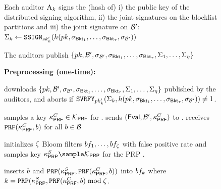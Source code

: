 \begin{figure}
{\begin{minipage}[t]{\textwidth}
\item 
Each auditor $\auditor[\auditorIdx]$ signs the (hash of) i) the public key of the distributed signing algorithm, ii) the joint signatures on the blocklist partitions and iii) the joint signature on $\blocklist'$:  $\auditorSig{\auditorIdx} \assign \signGenSig[\auditorPrivKeyGenericScheme[\auditorIdx]](\hashFn(\pubKey,  \genericSig[\bucket{1}], \dots, \genericSig[\bucket{\numBuckets}], \genericSig[\blocklist']))$

\item The auditors publish $\{\pubKey, \blocklist', \genericSig[\blocklist'], \genericSig[\bucket{1}], \dots, \genericSig[\bucket{\numBuckets}], \auditorSig{1}, \dots, \auditorSig{\numAuditors}  \}$ 


\protocolStepListEnd

\smallskip\noindent\textbf{Preprocessing (one-time):}



\item \label{pre:authOPRF} \client downloads $\{\pubKey, \blocklist', \genericSig[\blocklist'], \genericSig[\bucket{1}], \dots, \genericSig[\bucket{\numBuckets}], \auditorSig{1}, \dots, \auditorSig{\numAuditors} \}$ published by the auditors, and aborts if $\verifyGenSig[\auditorPubKeyGenericScheme[\auditorIdx]] (\auditorSig{\auditorIdx}, \hashFn(\pubKey,  \genericSig[\bucket{1}], \dots, \genericSig[\bucket{\numBuckets}], \genericSig[\blocklist'])) \neq 1$. 

\item \client samples a key $\kappa_{\mathsf{PRF}}^{C} \in \mathcal{K}_{\mathsf{PRF}}$ for \prf.  \client sends $(\evaluate, \blocklist', \prfKeyClient)$ to \authOPRFFunc. \server receives $\prf(\prfKeyClient, \genericBlocklistElmt)$ for all $\genericBlocklistElmt \in \blocklist$




\item \label{pre:bloom_filter_init} \server initializes $\zeta$ Bloom filters $\bloomFilter[1], \dots, \bloomFilter[\numBins]$ with false positive rate \bloomFilterEpsilon and samples key $\prpKeyServer \sample \prpKeySpace$ for the PRP \prp.

\item \label{pre:bloom_filter_assign} \server inserts $\genericBlocklistElmt$ and $\prp(\prpKeyServer, \prf(\prfKeyClient,\genericBlocklistElmt))$ into $\bloomFilter[\bloomFilterIdx]$ where $\bloomFilterIdx = \prp(\prpKeyServer, \prf(\prfKeyClient,\genericBlocklistElmt) \bmod \numBins$. 


\end{minipage}}
\end{figure}
